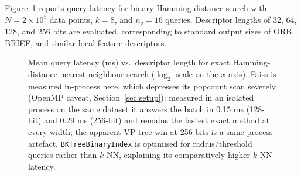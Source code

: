 \documentclass[11pt,a4paper]{article}
\begin{document}
Figure~\ref{fig:binary} reports query latency for binary Hamming-distance
search with $N = 2 \times 10^5$ data points, $k = 8$, and
$n_q = 16$ queries.  Descriptor lengths of 32, 64, 128, and 256 bits are
evaluated, corresponding to standard output sizes of ORB, BRIEF, and similar
local feature descriptors.

\begin{figure}[h]
\centering
{}
\caption{Mean query latency (ms) vs.\ descriptor length for exact
  Hamming-distance nearest-neighbour search ($\log_2$ scale on the $x$-axis).
  Faiss is measured in-process here, which depresses its popcount scan
  severely (OpenMP caveat, Section~\ref{sec:setup}): measured in an
  isolated process on the same dataset it answers the batch in 0.15 ms
  (128-bit) and 0.29 ms (256-bit) and remains the fastest exact method
  at every width; the apparent VP-tree win at 256 bits is a same-process
  artefact.
  \texttt{BKTreeBinaryIndex} is optimised for radius/threshold queries
  rather than $k$-NN, explaining its comparatively higher $k$-NN latency.}
\label{fig:binary}
\end{figure}
\end{document}
